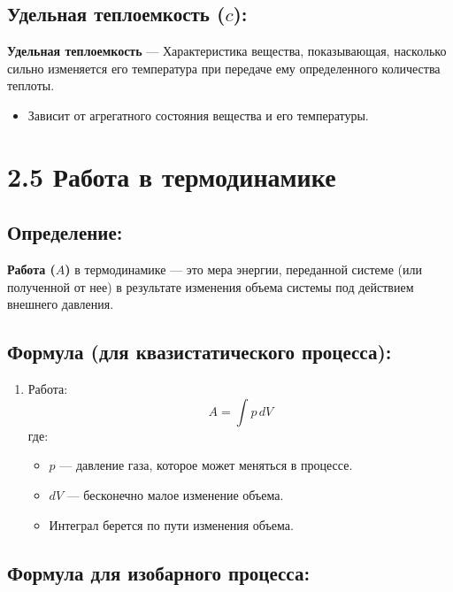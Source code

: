 \documentclass[a4paper,12pt]{article}
\begin{document}
\subsection*{Удельная теплоемкость ($c$):} 
\textbf{Удельная теплоемкость} --- Характеристика вещества, показывающая, насколько сильно изменяется его температура при передаче ему определенного количества теплоты.
\vspace{-3pt}
\begin{itemize}
    \item Зависит от агрегатного состояния вещества и его температуры.
\end{itemize}

\section*{2.5 Работа в термодинамике}

\vspace{-9pt}
\subsection*{Определение:}
\vspace{-3pt}
\textbf{Работа ($A$)} в термодинамике — это мера энергии, переданной системе (или полученной от нее) в результате изменения объема системы под действием внешнего давления.

\vspace{-9pt}
\subsection*{Формула (для квазистатического процесса):}
\vspace{-3pt}
\begin{enumerate}[itemsep=0pt, topsep=0pt, parsep=3pt]
    \item Работа:
    \vspace{-0.05em}
    $$ A = \int p \, dV $$
    где:
    \begin{itemize}
        \item $p$ — давление газа, которое может меняться в процессе.
        \item $dV$ — бесконечно малое изменение объема.
        \item Интеграл берется по пути изменения объема.
    \end{itemize}
\end{enumerate}

\vspace{-9pt}
\subsection*{Формула для изобарного процесса:}
\vspace{-3pt}
\end{document}
